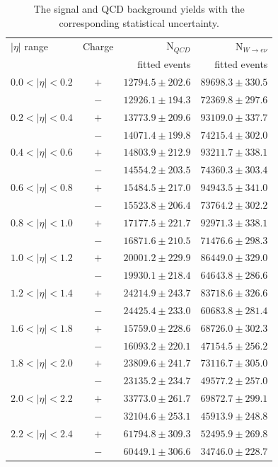\begin{table}[htbp]
 \begin{center}
 \begin{tabular}{lcrr}
\toprule
$|\eta|$ range &  Charge &  N$_{QCD}$     & N$_{W\rightarrow e \nu}$  \\
               &         & fitted events & fitted events            \\
\midrule
$0.0<| \eta |<0.2$ &  $+$ & $12794.5 \pm 202.6$ &$89698.3\pm330.5$ \\
                   &  $-$ & $12926.1 \pm 194.3$ &$72369.8\pm297.6$ \\ 
$0.2<| \eta |<0.4$ &  $+$ & $13773.9 \pm 209.6$ &$93109.0\pm337.7$ \\
                   &  $-$ & $14071.4 \pm 199.8$ &$74215.4\pm302.0$ \\ 
$0.4<| \eta |<0.6$ &  $+$ & $14803.9 \pm 212.9$ &$93211.7\pm338.1$ \\
                   &  $-$ & $14554.2 \pm 203.5$ &$74360.3\pm303.4$ \\ 
$0.6<| \eta |<0.8$ &  $+$ & $15484.5 \pm 217.0$ &$94943.5\pm341.0$ \\
                   &  $-$ & $15523.8 \pm 206.4$ &$73764.2\pm302.2$ \\ 
$0.8<| \eta |<1.0$ &  $+$ & $17177.5 \pm 221.7$ &$92971.3\pm338.1$ \\
                   &  $-$ & $16871.6 \pm 210.5$ &$71476.6\pm298.3$ \\ 
$1.0<| \eta |<1.2$ &  $+$ & $20001.2 \pm 229.9$ &$86449.0\pm329.0$ \\
                   &  $-$ & $19930.1 \pm 218.4$ &$64643.8\pm286.6$ \\ 
$1.2<| \eta |<1.4$ &  $+$ & $24214.9 \pm 243.7$ &$83718.6\pm326.6$ \\
                   &  $-$ & $24425.4 \pm 233.0$ &$60683.8\pm281.4$ \\ 
$1.6<| \eta |<1.8$ &  $+$ & $15759.0 \pm 228.6$ &$68726.0\pm302.3$ \\
                   &  $-$ & $16093.2 \pm 220.1$ &$47154.5\pm256.2$ \\ 
$1.8<| \eta |<2.0$ &  $+$ & $23809.6 \pm 241.7$ &$73116.7\pm305.0$ \\
                   &  $-$ & $23135.2 \pm 234.7$ &$49577.2\pm257.0$ \\ 
$2.0<| \eta |<2.2$ &  $+$ & $33773.0 \pm 261.7$ &$69872.7\pm299.1$ \\
                   &  $-$ & $32104.6 \pm 253.1$ &$45913.9\pm248.8$ \\ 
$2.2<| \eta |<2.4$ &  $+$ & $61794.8 \pm 309.3$ &$52495.9\pm269.8$ \\
                   &  $-$ & $60449.1 \pm 306.6$ &$34746.0\pm228.7$ \\ 
\bottomrule
 \end{tabular}
 \caption{\label{tab:updatedsigyield} The signal and {QCD} background yields
with the corresponding statistical uncertainty.}
 \end{center}
\end{table}

